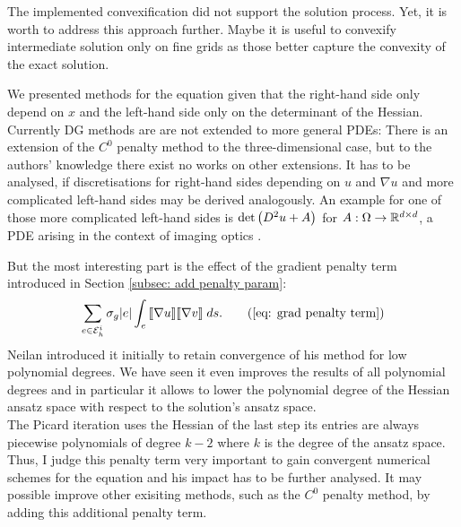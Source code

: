 The implemented convexification did not support the solution process. Yet, it is worth to address this approach further. Maybe it is useful to convexify intermediate solution only on fine grids as those better capture the convexity of the exact solution.

We presented methods for the \MA equation given that the right-hand side only depend on $x$ and the left-hand side only on the determinant of the Hessian. Currently DG methods are are not extended to more general PDEs: There is an extension of the $C^0$ penalty method to the three-dimensional case\cite{BGN+2013}, but to the authors' knowledge there exist no works on other extensions. It has to be analysed, if  discretisations for right-hand sides depending on $u$ and $\nabla u$ and more complicated left-hand sides may be derived analogously. An example for one of those more complicated left-hand sides is $\det{\left(D^2 u +A\right)}$ for $A:\Omega \rightarrow \mathbb{R}^{d \times d}$, a PDE arising in the context of imaging optics \cite{BHP2014}.
 
But the most interesting part is the effect of the gradient penalty term introduced in Section \ref{subsec: add penalty param}:
\begin{align}
	\sum_{e \in \edgesi} \sigma_g |e |\myIntS e {\jump{ \nabla u} \jump {\nabla v}}. \tag{\ref{eq: grad penalty term}}
\end{align}
Neilan introduced it initially to retain convergence of his method for low polynomial degrees. We have seen it even improves the results of all polynomial degrees and in particular it allows to lower the polynomial degree of the Hessian ansatz space with respect to the solution's ansatz space. \\
The Picard iteration uses the Hessian of the last step its entries are always piecewise polynomials of degree $k-2$ where $k$ is the degree of the ansatz space. Thus, I judge this penalty term very important to gain convergent numerical schemes for the \MA equation and his impact has to be further analysed. It may possible improve other exisiting methods, such as the $C^0$ penalty method, by adding this additional penalty term. 

